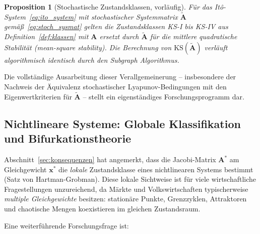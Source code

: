 \documentclass[a4paper, 12pt, twoside, openright]{report}
\newtheorem{proposition}[theorem]{Proposition}
\theoremstyle{definition}
\theoremstyle{definition}
\newcommand{\vx}{\bm{x}}
\newcommand{\vA}{\bm{A}}
\newcommand{\KS}{\mathrm{KS}}
\begin{document}
\begin{proposition}[Stochastische Zustandsklassen, vorläufig]
Für das Itô-System~\eqref{eq:ito_system} mit stochastischer Systemmatrix $\tilde{\vA}$
gemäß~\eqref{eq:stoch_sysmat} gelten die Zustandsklassen KS-I bis KS-IV aus
Definition~\ref{def:klassen} mit $\vA$ ersetzt durch $\tilde{\vA}$ für die
mittlere quadratische Stabilität (mean-square stability). Die Berechnung von
$\KS(\tilde{\vA})$ verläuft algorithmisch identisch durch den Subgraph Algorithmus.
\end{proposition}

\noindent
Die vollständige Ausarbeitung dieser Verallgemeinerung -- insbesondere der Nachweis
der Äquivalenz stochastischer Lyapunov-Bedingungen mit den Eigenwertkriterien für
$\tilde{\vA}$ -- stellt ein eigenständiges Forschungsprogramm dar.

\subsection{Nichtlineare Systeme: Globale Klassifikation und Bifurkationstheorie}
\label{subsec:nichtlinear}

Abschnitt~\ref{sec:konsequenzen} hat angemerkt, dass die Jacobi-Matrix $\vA^*$ am
Gleichgewicht $\vx^*$ die \emph{lokale} Zustandsklasse eines nichtlinearen Systems
bestimmt (Satz von Hartman-Grobman). Diese lokale Sichtweise ist für viele wirtschaftliche
Fragestellungen unzureichend, da Märkte und Volkswirtschaften typischerweise
\emph{multiple Gleichgewichte} besitzen: stationäre Punkte, Grenzzyklen, Attraktoren und
chaotische Mengen koexistieren im gleichen Zustandsraum.

Eine weiterführende Forschungsfrage ist:
\end{document}
